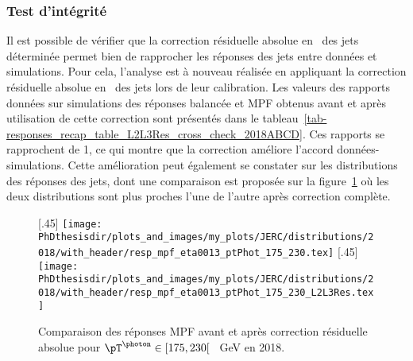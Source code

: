 \subsubsection{Test d'intégrité}\label{chapter-JERC-section-JES-subsec-results-subsubsec-L2L3Res_cross_check}
Il est possible de vérifier que la correction résiduelle absolue en \pT\ des jets déterminée permet bien de rapprocher les réponses des jets entre données et simulations.
Pour cela, l'analyse est à nouveau réalisée en appliquant la correction résiduelle absolue en \pT\ des jets lors de leur calibration.
Les valeurs des rapports données sur simulations des réponses balancée et MPF obtenus avant et après utilisation de cette correction sont présentés dans le tableau~\ref{tab-responses_recap_table_L2L3Res_cross_check_2018ABCD}. Ces rapports se rapprochent de \num{1}, ce qui montre que la correction améliore l'accord données-simulations.
Cette amélioration peut également se constater sur les distributions des réponses des jets, dont une comparaison est proposée sur la figure~\ref{fig-distribs_Gjets_18_resp_mpf_L2L3Res_cross_check} où les deux distributions sont plus proches l'une de l'autre après correction complète.

\begin{figure}[h]
\centering
{}[.45\textwidth]
{\texttt{[image: \\PhDthesisdir/plots\_and\_images/my\_plots/JERC/distributions/2018/with\_header/resp\_mpf\_eta0013\_ptPhot\_175\_230.tex]}}
\hfill
{}[.45\textwidth]
{\texttt{[image: \\PhDthesisdir/plots\_and\_images/my\_plots/JERC/distributions/2018/with\_header/resp\_mpf\_eta0013\_ptPhot\_175\_230\_L2L3Res.tex]}}
\caption[Comparaison des réponses MPF avant et après correction résiduelle absolue en 2018.]{Comparaison des réponses MPF avant et après correction résiduelle absolue  pour $\pT^{\photon}\in[175, 230[$ \SI{}{\GeV} en 2018.}
\label{fig-distribs_Gjets_18_resp_mpf_L2L3Res_cross_check}
\end{figure}